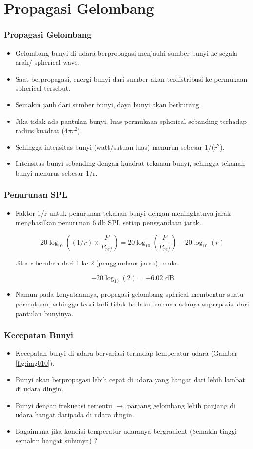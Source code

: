 \documentclass[pdflatex,compress]{beamer}
\begin{document}
\section{Propagasi Gelombang}
\begin{frame}
	\frametitle{Propagasi Gelombang}
	\begin{itemize}
		\item Gelombang bunyi di udara berpropagasi menjauhi sumber bunyi ke segala arah/ spherical wave.
		\item Saat berpropagasi, energi bunyi dari sumber akan terdistribusi ke permukaan spherical tersebut.
		\item Semakin jauh dari sumber bunyi, daya bunyi akan berkurang.
		\item Jika tidak ada pantulan bunyi, luas permukaan spherical sebanding terhadap radius kuadrat ($ 4\pi r^2 $).
		\item Sehingga intensitas bunyi (watt/satuan luas) menurun sebesar 1/($ r^2 $).
		\item Intensitas bunyi sebanding dengan kuadrat tekanan bunyi, sehingga tekanan bunyi menurus sebesar 1/r.
	\end{itemize}
\end{frame}

\begin{frame}
	\frametitle{Penurunan SPL}
	\begin{itemize}
		\item Faktor 1/r untuk penurunan tekanan bunyi dengan meningkatnya jarak menghasilkan penurunan 6 db SPL setiap penggandaan jarak.
		
		\[ 20 \log_{10}((1/r) \times \frac{P}{P_{ref}}) = 20 \log_{10}(\frac{P}{P_{ref}}) - 20 \log_{10}(r) \]
		
		Jika r berubah dari 1 ke 2 (penggandaan jarak), maka
		
		\[ -20 \log_{10}(2) = -6.02 \text{ dB}\]
		\item Namun pada kenyataannya, propagasi gelombang sphrical membentur suatu permukaan, sehingga teori tadi tidak berlaku karenan adanya superposisi dari pantulan bunyinya.
	\end{itemize}
\end{frame}

\begin{frame}
	\frametitle{Kecepatan Bunyi}
	\begin{itemize}
		\item Kecepatan bunyi di udara bervariasi terhadap temperatur udara (Gambar \ref{fig:img010}).
		\item Bunyi akan berpropagasi lebih cepat di udara yang hangat dari lebih lambat di udara dingin.
		\item Bunyi dengan frekuensi tertentu $\rightarrow$ panjang gelombang lebih panjang di udara hangat daripada di udara dingin.
		\item Bagaimana jika kondisi temperatur udaranya bergradient (Semakin tinggi semakin hangat suhunya) ?
	\end{itemize}
\end{frame}
\end{document}
